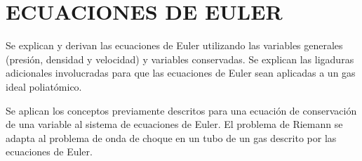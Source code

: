 \chapter{ECUACIONES DE EULER}

Se explican y derivan las ecuaciones de Euler utilizando las variables generales (presión, densidad y velocidad) y variables conservadas. Se explican las ligaduras adicionales involucradas para que las ecuaciones de Euler sean aplicadas a un gas ideal poliatómico.

Se aplican los conceptos previamente descritos para una ecuación de conservación de una variable al sistema de ecuaciones de Euler. El problema de Riemann se adapta al problema de onda de choque en un tubo de un gas descrito por las ecuaciones de Euler.

